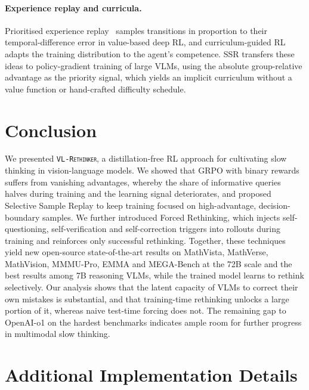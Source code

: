 \documentclass{article}
\newcommand{\model}{\texttt{\textsc{VL-Rethinker}}\xspace}
\begin{document}
\paragraph{Experience replay and curricula.} Prioritised experience replay~\citep{per} samples transitions in proportion to their temporal-difference error in value-based deep RL, and curriculum-guided RL~\citep{curriculum} adapts the training distribution to the agent's competence. SSR transfers these ideas to policy-gradient training of large VLMs, using the absolute group-relative advantage as the priority signal, which yields an implicit curriculum without a value function or hand-crafted difficulty schedule.

\section{Conclusion}
\label{sec:conclusion}

We presented \model, a distillation-free RL approach for cultivating slow thinking in vision-language models. We showed that GRPO with binary rewards suffers from vanishing advantages, whereby the share of informative queries halves during training and the learning signal deteriorates, and proposed Selective Sample Replay to keep training focused on high-advantage, decision-boundary samples. We further introduced Forced Rethinking, which injects self-questioning, self-verification and self-correction triggers into rollouts during training and reinforces only successful rethinking. Together, these techniques yield new open-source state-of-the-art results on MathVista, MathVerse, MathVision, MMMU-Pro, EMMA and MEGA-Bench at the 72B scale and the best results among 7B reasoning VLMs, while the trained model learns to rethink selectively. Our analysis shows that the latent capacity of VLMs to correct their own mistakes is substantial, and that training-time rethinking unlocks a large portion of it, whereas naive test-time forcing does not. The remaining gap to OpenAI-o1 on the hardest benchmarks indicates ample room for further progress in multimodal slow thinking.





\clearpage
\appendix

\section{Additional Implementation Details}
\label{app:details}
\end{document}
